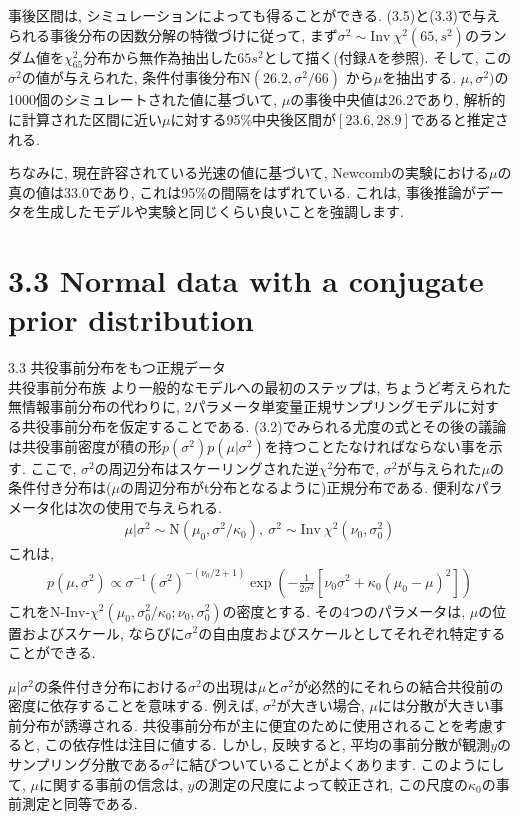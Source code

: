 \documentclass[10pt,dvipdfmx,a4]{beamer}
\newcommand{\eq}[1]{\begin{align}#1\end{align}}
\newcommand{\eqn}[1]{\begin{align*}#1\end{align*}}
\begin{document}

\begin{frame}
事後区間は, シミュレーションによっても得ることができる.
(3.5)と(3.3)で与えられる事後分布の因数分解の特徴づけに従って, まず$\sigma^2\sim \text{Inv}\ \chi^2(65, s^2)$のランダム値を$\chi^2_65$分布から無作為抽出した$65s^2$として描く(付録Aを参照).
そして, この$\sigma^2$の値が与えられた, 条件付事後分布$\text{N}(26.2, \sigma^2/66)$ から$\mu$を抽出する.
$\mu,\sigma^2)$の1000個のシミュレートされた値に基づいて, $\mu$の事後中央値は26.2であり, 解析的に計算された区間に近い$\mu$に対する95\%中央後区間が$[23.6,28.9]$であると推定される.

ちなみに, 現在許容されている光速の値に基づいて, Newcombの実験における$\mu$の真の値は33.0であり, これは95\%の間隔をはずれている.
これは, 事後推論がデータを生成したモデルや実験と同じくらい良いことを強調します.
\end{frame}

\section{3.3 Normal data with a conjugate prior distribution}
\begin{frame}{3.3 共役事前分布をもつ正規データ\\共役事前分布族}
より一般的なモデルへの最初のステップは, ちょうど考えられた無情報事前分布の代わりに, 2パラメータ単変量正規サンプリングモデルに対する共役事前分布を仮定することである.
(3.2)でみられる尤度の式とその後の議論は共役事前密度が積の形$p(\sigma^2)p(\mu|\sigma^2)$を持つことたなければならない事を示す.
ここで, $\sigma^2$の周辺分布はスケーリングされた逆$\chi^2$分布で, $\sigma^2$が与えられた$\mu$の条件付き分布は($\mu$の周辺分布がt分布となるように)正規分布である.
便利なパラメータ化は次の使用で与えられる.
\eqn{\mu|\sigma^2\sim \text{N}(\mu_0,\sigma^2/\kappa_0),\ \sigma^2\sim \text{Inv}\ \chi^2(\nu_0,\sigma_0^2)}
これは, 
\eq{p(\mu,\sigma^2)\propto \sigma^{-1}(\sigma^2)^{-(\nu_0/2+1)}\exp\left(-\frac{1}{2\sigma^2}[\nu_0\sigma^2+\kappa_0(\mu_0-\mu)^2]\right)}
これを$\text{N-Inv-}\chi^2(\mu_0,\sigma^2_0/\kappa_0;\nu_0,\sigma^2_0)$の密度とする.
その4つのパラメータは, $\mu$の位置およびスケール, ならびに$\sigma^2$の自由度およびスケールとしてそれぞれ特定することができる.
\end{frame}


\begin{frame}
$\mu|\sigma^2$の条件付き分布における$\sigma^2$の出現は$\mu$と$\sigma^2$が必然的にそれらの結合共役前の密度に依存することを意味する.
例えば, $\sigma^2$が大きい場合, $\mu$には分散が大きい事前分布が誘導される.
共役事前分布が主に便宜のために使用されることを考慮すると, この依存性は注目に値する.
しかし, 反映すると, 平均の事前分散が観測$y$のサンプリング分散である$\sigma^2$に結びついていることがよくあります.
このようにして, $\mu$に関する事前の信念は, $y$の測定の尺度によって較正され, この尺度の$\kappa_0$の事前測定と同等である.
\end{frame}
\end{document}
